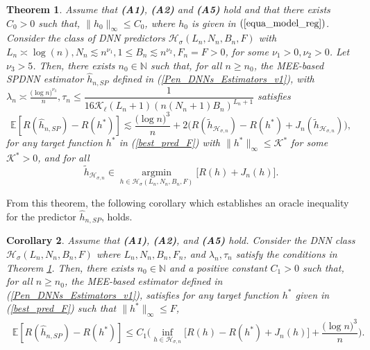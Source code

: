\documentclass[10pt,twoside]{article}
\numberwithin{equation}{section}
\newtheorem{thm}{Theorem}[section]
\newtheorem{Corol}[thm]{Corollary}
\newcommand{\E}{\ensuremath{\mathbb{E}}}
\newcommand{\N}{\ensuremath{\mathbb{N}}}
\DeclareMathOperator*{\argmin}{argmin}
\begin{document}
\begin{thm}\label{excess_risk_bound__expo_strong_mixing_thm2}
Assume that \textbf{(A1)}, \textbf{(A2)} and \textbf{(A5)} hold and that there exists $C_0>0$ such that, $\|h_0\|_{\infty} \leq C_0$, where $h_0$ is given in $(\ref{equa_model_reg})$. 
%
Consider the class of DNN predictors $\mathcal{H}_{\sigma}(L_n, N_n, B_n, F)$ with $ L_n \asymp\log(n), N_n \lesssim n^{\nu_1}, 1 \leq B_n \lesssim n^{\nu_2}, F_n = F > 0$, for some $ \nu_1 > 0, \nu_2 > 0$.  
%
Let $\nu_3 > 5$.
Then, there exists $n_0 \in \N$ such that, for all $n \geq n_0$, the MEE-based SPDNN estimator $\widehat{h}_{n,SP}$ defined in (\ref{Pen_DNNs_Estimators_v1}),
%
% 
with $\lambda_n \asymp \frac{\big(\log n
 \big) ^{\nu_3}}{n}, \tau_n \leq \dfrac{1}{16 \mathcal{K}_{\ell}(L_n + 1)(n(N_n + 1)B_n)^{L_n + 1} }$ satisfies
%
\begin{equation}
 \E[R(\widehat{h}_{n,SP}) - R(h^*) ]  \lesssim   \dfrac{\big(\log n\big)^3}{n} + 2\big(R(\widetilde{h}_{\mathcal{H}_{\sigma, n}}) - R(h^*) + J_n(\widetilde{h}_{\mathcal{H}_{\sigma, n}})\big),
\end{equation}
%
for any target function $h^*$ in (\ref{best_pred_F}) with $\|h^{*}\|_{\infty} \leq \mathcal{K}^*$ for some $\mathcal{K}^* >0$,
and for all 
\begin{equation}\label{def_target_tilde_spdnn}
 \widetilde{h}_{\mathcal{H}_{\sigma, n}} \in  \underset{h\in \mathcal{H}_{\sigma}(L_n, N_n, B_n, F)}{\argmin} \Big[R(h) + J_n(h) \Big].  
\end{equation}
%
\end{thm}
%
%
\noindent
From this theorem, the following corollary which establishes an oracle inequality for the predictor $\widehat{h}_{n,SP}$, holds.
%
\begin{Corol}\label{equa_oracle_ineq_expo_strong_mixing}
Assume that \textbf{(A1)}, \textbf{(A2)}, and \textbf{(A5)} hold. Consider the DNN class $\mathcal{H}_{\sigma}(L_n, N_n, B_n, F)$ where $ L_n, N_n, B_n, F_n$, and $\lambda_n, \tau_n$ satisfy the conditions in Theorem \ref{excess_risk_bound__expo_strong_mixing_thm2}. 
 Then, there exists $n_0 \in \N$ and a positive constant $C_1 > 0$ such that, for all $n \geq n_0$, the MEE-based estimator defined in (\ref{Pen_DNNs_Estimators_v1}), satisfies for any target function $h^{*}$ given in (\ref{best_pred_F}) such that $\|h^{*}\|_{\infty} \leq F$,
%
%
 \begin{align}\label{proof expected_excess_risk}
\ \E[R(\widehat{h}_{n,SP}) - R(h^*) ]
  \leq C_1\Bigg(\underset{h \in \mathcal{H}_{\sigma, n}} {\inf} \Big[ R(h) - R(h^*) + J_n(h) \Big]    +  \dfrac{\big(\log n\big)^3}{n} \Bigg).
\end{align}
% 
\end{Corol}
\end{document}
